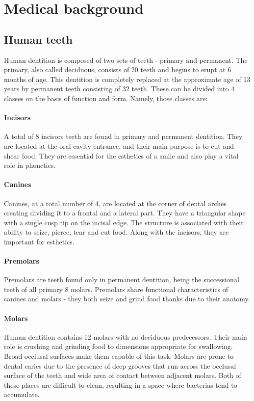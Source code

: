 \chapter{Medical background}

\section{Human teeth}
Human dentition is composed of two sets of teeth - primary and permanent. The primary, also called deciduous, consists of 20 teeth and begins to erupt at 6 months of age. This dentition is completely replaced at the approximate age of 13 years by permanent teeth consisting of 32 teeth. These can be divided into 4 classes on the basis of function and form. Namely, those classes are:

\subsubsection*{Incisors}
A total of 8 incisors teeth are found in primary and permanent dentition. They are located at the oral cavity entrance, and their main purpose is to cut and shear food. They are essential for the esthetics of a smile and also play a vital role in phonetics.

\subsubsection*{Canines}
Canines, at a total number of 4, are located at the corner of dental arches creating dividing it to a frontal and a lateral part. They have a triangular shape with a single cusp tip on the incisal edge. The structure is associated with their ability to seize, pierce, tear and cut food. Along with the incisors, they are important for esthetics.

\subsubsection*{Premolars}
Premolars are teeth found only in permanent dentition, being the successional teeth of all primary 8 molars. Premolars share functional characteristics of canines and molars - they both seize and grind food thanks due to their anatomy.

\subsubsection*{Molars}
Human dentition contains 12 molars with no deciduous predecessors. Their main role is crushing and grinding food to dimensions appropriate for swallowing. Broad occlusal surfaces make them capable of this task. Molars are prone to dental caries due to the presence of deep grooves that run across the occlusal surface of the teeth and wide area of contact between adjacent molars. Both of these places are difficult to clean, resulting in a space where bacterias tend to accumulate.


